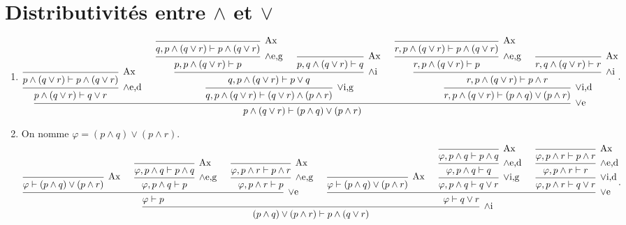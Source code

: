 \section{Distributivités entre $\land$\/ et $\lor$}

\begin{enumerate}
	\item
		\[
			\begin{prooftree}
				\infer 0[Ax]{p \land (q \lor r) \vdash p \land (q \lor r)}
				\infer 1[$\land$e,d]{p \land (q \lor r) \vdash  q \lor r} %
				\infer 0[Ax]{q,p \land (q \lor r) \vdash p \land (q \lor r)}
				\infer 1[$\land$e,g]{p,p \land (q \lor r) \vdash p} %
				\infer 0[Ax]{p, q \land (q \lor r) \vdash q}
				\infer 2[$\land$i]{q, p \land(q \lor r) \vdash p \lor q}
				\infer 1[$\lor$i,g]{q,p \land(q \lor r) \vdash (q \lor r) \land (p \land r)}
				\infer 0[Ax]{r,p \land (q \lor r) \vdash p \land (q \lor r)}
				\infer 1[$\land$e,g]{r,p \land (q \lor r) \vdash p} %
				\infer 0[Ax]{r, q \land (q \lor r) \vdash r}
				\infer 2[$\land$i]{r, p \land(q \lor r) \vdash p \land r}
				\infer 1[$\lor$i,d]{r, p \land (q \lor r) \vdash (p \land q) \lor (p \land r)}
				\infer 3[$\lor$e]{p \land (q \lor r) \vdash (p \land q) \lor (p \land r)} %
			\end{prooftree}
		.\] 
	\item On nomme $\varphi = (p \land q) \lor (p \land r)$.
		\[
			\begin{prooftree}
				\infer 0[Ax]{\varphi \vdash (p \land q) \lor (p \land r)}
				\infer 0[Ax]{\varphi,p\land q \vdash p \land q}
				\infer 1[$\land$e,g]{\varphi, p \land q \vdash p} %
				\infer 0[Ax]{\varphi,p \land r \vdash p \land r}
				\infer 1[$\land$e,g]{\varphi, p \land r \vdash p} %
				\infer 3[$\lor$e]{\varphi \vdash p} %
				\infer 0[Ax]{\varphi \vdash (p \land q) \lor (p \land r)}
				\infer 0[Ax]{\varphi, p \land q \vdash p \land q}
				\infer 1[$\land$e,d]{\varphi, p \land q \vdash q} %
				\infer 1[$\lor$i,g]{\varphi, p \land q \vdash q \lor r}
				\infer 0[Ax]{\varphi, p \land r \vdash p \land r}
				\infer 1[$\land$e,d]{\varphi, p \land r \vdash r} %
				\infer 1[$\lor$i,d]{\varphi, p \land r \vdash q \lor r}
				\infer 3[$\lor$e]{\varphi \vdash q \lor r} %
				\infer 2[$\land$i]{(p \land q) \lor (p \land r) \vdash p \land (q \lor r)}
			\end{prooftree}
		.\] 
\end{enumerate}
